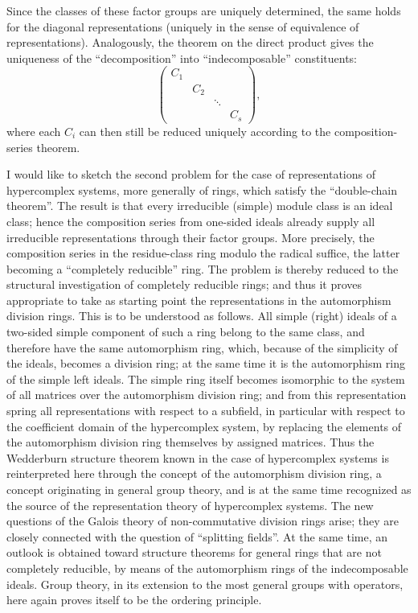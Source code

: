 \documentclass[11pt]{article}
\begin{document}
Since the classes of these factor groups are uniquely determined, the same holds for the diagonal representations (uniquely in the sense of equivalence of representations). Analogously, the theorem on the direct product gives the uniqueness of the ``decomposition'' into ``indecomposable'' constituents:
\[
\begin{pmatrix}
C_1&&&\\
&C_2&&\\
&&\ddots&\\
&&&C_s
\end{pmatrix},
\]
where each $C_i$ can then still be reduced uniquely according to the composition-series theorem.

I would like to sketch the second problem for the case of representations of hypercomplex systems, more generally of rings, which satisfy the ``double-chain theorem''. The result is that every irreducible (simple) module class is an ideal class; hence the composition series from one-sided ideals already supply all irreducible representations through their factor groups. More precisely, the composition series in the residue-class ring modulo the radical suffice, the latter becoming a ``completely reducible'' ring. The problem is thereby reduced to the structural investigation of completely reducible rings; and thus it proves appropriate to take as starting point the representations in the automorphism division rings. This is to be understood as follows. All simple (right) ideals of a two-sided simple component of such a ring belong to the same class, and therefore have the same automorphism ring, which, because of the simplicity of the ideals, becomes a division ring; at the same time it is the automorphism ring of the simple left ideals. The simple ring itself becomes isomorphic to the system of all matrices over the automorphism division ring; and from this representation spring all representations with respect to a subfield, in particular with respect to the coefficient domain of the hypercomplex system, by replacing the elements of the automorphism division ring themselves by assigned matrices. Thus the Wedderburn structure theorem known in the case of hypercomplex systems is reinterpreted here through the concept of the automorphism division ring, a concept originating in general group theory, and is at the same time recognized as the source of the representation theory of hypercomplex systems. The new questions of the Galois theory of non-commutative division rings arise; they are closely connected with the question of ``splitting fields''. At the same time, an outlook is obtained toward structure theorems for general rings that are not completely reducible, by means of the automorphism rings of the indecomposable ideals. Group theory, in its extension to the most general groups with operators, here again proves itself to be the ordering principle.
\end{document}
